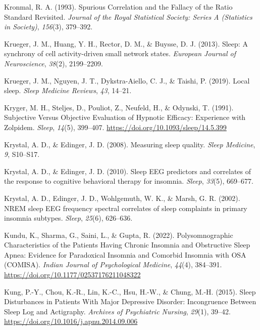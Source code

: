 \documentclass[
]{article}
\newlength{\cslhangindent}
\newenvironment{CSLReferences}[2] %
 {\begin{list}{}{%
  \setlength{\itemindent}{0pt}
  \setlength{\leftmargin}{0pt}
  \setlength{\parsep}{0pt}
  \ifodd #1
   \setlength{\leftmargin}{\cslhangindent}
   \setlength{\itemindent}{-1\cslhangindent}
  \fi
  \setlength{\itemsep}{#2\baselineskip}}}
 {\end{list}}
\begin{document}
\begin{CSLReferences}{1}{0}
Kronmal, R. A. (1993). {Spurious Correlation and the Fallacy of the Ratio Standard Revisited}. \emph{Journal of the Royal Statistical Society: Series A (Statistics in Society)}, \emph{156}(3), 379--392.

Krueger, J. M., Huang, Y. H., Rector, D. M., \& Buysse, D. J. (2013). Sleep: A synchrony of cell activity-driven small network states. \emph{European Journal of Neuroscience}, \emph{38}(2), 2199--2209.

Krueger, J. M., Nguyen, J. T., Dykstra-Aiello, C. J., \& Taishi, P. (2019). Local sleep. \emph{Sleep Medicine Reviews}, \emph{43}, 14--21.

Kryger, M. H., Steljes, D., Pouliot, Z., Neufeld, H., \& Odynski, T. (1991). Subjective {Versus} {Objective} {Evaluation} of {Hypnotic} {Efficacy}: {Experience} with {Zolpidem}. \emph{Sleep}, \emph{14}(5), 399--407. \url{https://doi.org/10.1093/sleep/14.5.399}

Krystal, A. D., \& Edinger, J. D. (2008). Measuring sleep quality. \emph{Sleep Medicine}, \emph{9}, S10--S17.

Krystal, A. D., \& Edinger, J. D. (2010). Sleep EEG predictors and correlates of the response to cognitive behavioral therapy for insomnia. \emph{Sleep}, \emph{33}(5), 669--677.

Krystal, A. D., Edinger, J. D., Wohlgemuth, W. K., \& Marsh, G. R. (2002). NREM sleep EEG frequency spectral correlates of sleep complaints in primary insomnia subtypes. \emph{Sleep}, \emph{25}(6), 626--636.

Kundu, K., Sharma, G., Saini, L., \& Gupta, R. (2022). Polysomnographic {Characteristics} of the {Patients} {Having} {Chronic} {Insomnia} and {Obstructive} {Sleep} {Apnea}: {Evidence} for {Paradoxical} {Insomnia} and {Comorbid} {Insomnia} with {OSA} ({COMISA}). \emph{Indian Journal of Psychological Medicine}, \emph{44}(4), 384--391. \url{https://doi.org/10.1177/02537176211048322}

Kung, P.-Y., Chou, K.-R., Lin, K.-C., Hsu, H.-W., \& Chung, M.-H. (2015). Sleep {Disturbances} in {Patients} {With} {Major} {Depressive} {Disorder}: {Incongruence} {Between} {Sleep} {Log} and {Actigraphy}. \emph{Archives of Psychiatric Nursing}, \emph{29}(1), 39--42. \url{https://doi.org/10.1016/j.apnu.2014.09.006}


\end{CSLReferences}
\end{document}

